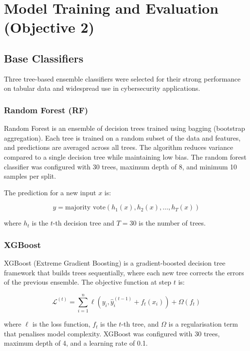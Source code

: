 \documentclass[12pt,a4paper,oneside]{report}
\begin{document}
\section{Model Training and Evaluation (Objective 2)}

\subsection{Base Classifiers}

Three tree-based ensemble classifiers were selected for their strong performance on tabular data and widespread use in cybersecurity applications.

\subsubsection{Random Forest (RF)}

Random Forest is an ensemble of decision trees trained using bagging (bootstrap aggregation). Each tree is trained on a random subset of the data and features, and predictions are averaged across all trees. The algorithm reduces variance compared to a single decision tree while maintaining low bias. The random forest classifier was configured with 30 trees, maximum depth of 8, and minimum 10 samples per split.

The prediction for a new input $x$ is:

\begin{equation}
    \label{eq:rf}
    \hat{y} = \text{majority vote}\left(h_1(x), h_2(x), \dots, h_T(x)\right)
\end{equation}

\noindent where $h_t$ is the $t$-th decision tree and $T = 30$ is the number of trees.

\subsubsection{XGBoost}

XGBoost (Extreme Gradient Boosting) is a gradient-boosted decision tree framework that builds trees sequentially, where each new tree corrects the errors of the previous ensemble. The objective function at step $t$ is:

\begin{equation}
    \label{eq:xgb}
    \mathcal{L}^{(t)} = \sum_{i=1}^{n} \ell(y_i, \hat{y}_i^{(t-1)} + f_t(x_i)) + \Omega(f_t)
\end{equation}

\noindent where $\ell$ is the loss function, $f_t$ is the $t$-th tree, and $\Omega$ is a regularisation term that penalises model complexity. XGBoost was configured with 30 trees, maximum depth of 4, and a learning rate of 0.1.
\end{document}
